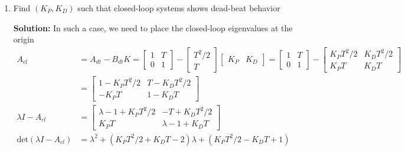 \documentclass[twoside]{article}
\begin{document}
\begin{enumerate}
\item Find $(K_P,K_D)$ such that closed-loop systems shows dead-beat behavior

\textbf{Solution:} In such a case, we need to place the closed-loop eigenvalues at the origin 
%
\begin{align*}
	A_{cl} &= A_{dt} - B_{dt} K =  \begin{bmatrix} 1 & T \\ 0 & 1 \end{bmatrix} - \begin{bmatrix} T^2/2 \\ T \end{bmatrix} 
	\begin{bmatrix} K_P & K_D \end{bmatrix} 
	=  \begin{bmatrix} 1 & T \\ 0 & 1 \end{bmatrix} -  \begin{bmatrix} K_P T^2/2  & K_D T^2/2 \\ K_P T & K_D T \end{bmatrix}  
	\\
	&=  \begin{bmatrix} 1 - K_P T^2/2  & T - K_D T^2/2 \\ - K_P T & 1 - K_D T \end{bmatrix}
	\\
	\lambda I - A_{cl} &= \begin{bmatrix} \lambda - 1 + K_P T^2/2  & - T + K_D T^2/2 \\  K_P T & \lambda -  1+ K_D T \end{bmatrix}
	\\
	\mathrm{det}\left( \lambda I - A_{cl} \right) &= \lambda^2 + \left( K_P T^2/2 + K_D T - 2 \right) \lambda + \left( K_P T^2/2 - K_D T + 1 \right)
\end{align*}

\end{enumerate}


\end{document}
